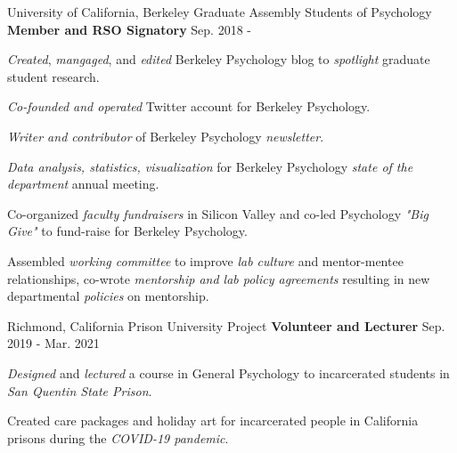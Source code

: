 

\begin{cventries}

  \cventry 
    {University of California, Berkeley} %
    {Graduate Assembly Students of Psychology}
    {\textbf{Member and RSO Signatory}} %
    {Sep. 2018 - } %
    {
      \begin{cvitems} %
        \item {\textit{Created}, \textit{mangaged}, and \textit{edited} Berkeley Psychology blog to \textit{spotlight} graduate student research.}
        \item {\textit{Co-founded and operated} Twitter account for Berkeley Psychology.}
        \item {\textit{Writer and contributor} of Berkeley Psychology \textit{newsletter}.}
        \item {\textit{Data analysis, statistics, visualization} for Berkeley Psychology \textit{state of the department} annual meeting.}
        \item {Co-organized \textit{faculty fundraisers} in Silicon Valley and co-led Psychology \textit{"Big Give"} to fund-raise for Berkeley Psychology.}
        \item {Assembled \textit{working committee} to improve \textit{lab culture} and mentor-mentee relationships, co-wrote \textit{mentorship and lab policy agreements} resulting in new departmental \textit{policies} on mentorship.}
      \end{cvitems}
    }
    
  \cventry
    {Richmond, California} %
    {Prison University Project}
    {\textbf{Volunteer and Lecturer}} %
    {Sep. 2019 - Mar. 2021} %
    {
      \begin{cvitems} %
        \item {\textit{Designed} and \textit{lectured} a course in General Psychology to incarcerated students in \textit{San Quentin State Prison}.}
        \item {Created care packages and holiday art for incarcerated people in California prisons during the \textit{COVID-19 pandemic}.}
      \end{cvitems}
    }
    

\end{cventries}
